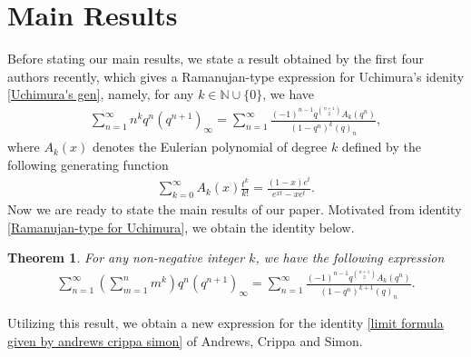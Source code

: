 \documentclass[11pt,reqno]{amsart}
\renewcommand{\(}{\left\(}
\renewcommand{\)}{\right\)}
\renewcommand{\[}{\left\[}
\renewcommand{\]}{\right\]}
\numberwithin{equation}{section}
\theoremstyle{plain}
\newtheorem{theorem}{Theorem}[section]
\begin{document}













\section{Main Results}\label{Main Results}
Before stating our main results,  we state a result  \cite[Corollary 2.14]{ABEM24} obtained by the first four authors recently,  which gives a Ramanujan-type expression for Uchimura's idenity \eqref{Uchimura's gen},  namely,   for any $k \in \mathbb{N}\cup \{0\}$,  we have 
\begin{align}\label{Ramanujan-type for Uchimura}
\sum_{n=1}^\infty n^k q^n(q^{n+1})_\infty =  \sum_{n=1}^\infty \frac{(-1)^{n-1} q^{ {n+1 \choose 2 } } A_k(q^n)}{(1-q^n)^k (q)_n}, 
\end{align}
where $A_k(x)$ denotes the Eulerian polynomial of degree $k$ defined by the following generating function
\begin{align*}
\sum_{k=0}^\infty A_{k}(x) \frac{t^k}{k!} = \frac{(1-x) e^t }{e^{xt} - x e^t}.  
\end{align*}
Now we are ready to state the main results of our paper.  Motivated from identity \eqref{Ramanujan-type for Uchimura},  we obtain the identity below.    
\begin{theorem} \label{a new q-series identity}
For any non-negative integer $k$, we have the following expression
\begin{align*}
\sum_{n=1}^\infty \left(\sum_{m=1}^n m^k\right) q^n(q^{n+1})_\infty = \sum_{n=1}^\infty \frac{(-1)^{n-1} q^{{n+1 \choose 2}}A_k(q^n)}{(1-q^n)^{k+1} (q)_n}.
\end{align*}
\end{theorem}
Utilizing this result,  we obtain a new expression for the identity \eqref{limit formula given by andrews crippa simon} of Andrews, Crippa and Simon.
\end{document}
